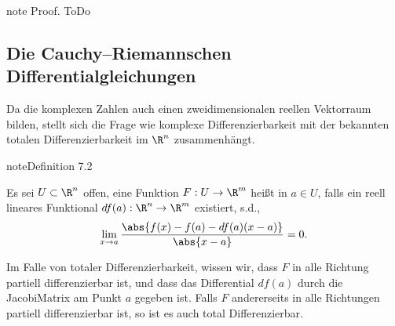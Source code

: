 \documentclass[letterpaper,10pt,german]{jupyterBook}
\begin{document}
\begin{sphinxadmonition}{note}
\sphinxAtStartPar
Proof. ToDo
\end{sphinxadmonition}


\subsection{Die Cauchy–Riemannschen Differentialgleichungen}
\label{\detokenize{complexanalysis/cauchyriemann:die-cauchy-riemannschen-differentialgleichungen}}
\sphinxAtStartPar
Da die komplexen Zahlen auch einen zweidimensionalen reellen Vektorraum bilden, stellt sich die Frage wie komplexe Differenzierbarkeit mit der bekannten totalen Differenzierbarkeit im \(\R^n\) zusammenhängt.
\label{complexanalysis/cauchyriemann:definition-5}
\begin{sphinxadmonition}{note}{Definition 7.2}



\sphinxAtStartPar
Es sei \(U\subset\R^n\) offen, eine Funktion \(F:U\to\R^m\) heißt  in \(a\in U\), falls ein reell lineares Funktional \(df(a):\R^n\to\R^m\) existiert, s.d.,
\begin{equation*}
\begin{split}\lim_{x\to a} \frac{\abs{f(x)-f(a) - df(a)(x-a)}}{\abs{x-a}} = 0.\end{split}
\end{equation*}\end{sphinxadmonition}

\sphinxAtStartPar
Im Falle von totaler Differenzierbarkeit, wissen wir, dass \(F\) in alle Richtung partiell differenzierbar ist, und dass das Differential \(df(a)\) durch die Jacobi\sphinxhyphen{}Matrix am Punkt \(a\) gegeben ist. Falls \(F\) andererseits in alle Richtungen  partiell differenzierbar ist, so ist es auch total Differenzierbar.
\end{document}
